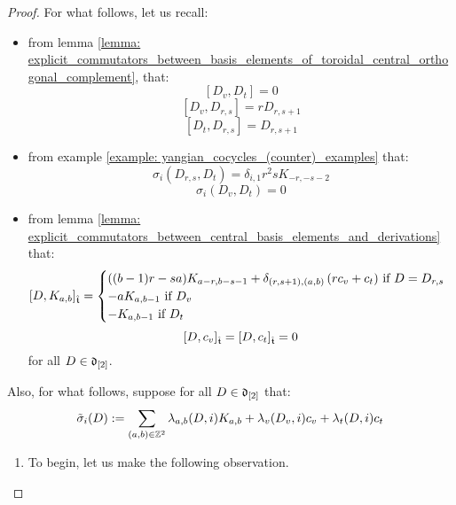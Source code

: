 \begin{proof}
                For what follows, let us recall:
                \begin{itemize}
                    \item from lemma \ref{lemma: explicit_commutators_between_basis_elements_of_toroidal_central_orthogonal_complement}, that:
                        $$[D_v, D_t] = 0$$
                        $$[D_v, D_{r, s}] = r D_{r, s + 1}$$
                        $$[D_t, D_{r, s}] = D_{r, s + 1}$$
                    \item from example \ref{example: yangian_cocycles_(counter)_examples} that:
                        $$\sigma_i(D_{r, s}, D_t) = \delta_{i, 1} r^2 s K_{-r, -s - 2}$$
                        $$\sigma_i(D_v, D_t) = 0$$
                    \item from lemma \ref{lemma: explicit_commutators_between_central_basis_elements_and_derivations} that:
                        $$
                            [D, K_{a, b}]_{\hat{\mathfrak{t}}} =
                            \begin{cases}
                                \text{$((b - 1)r - sa) K_{a - r, b - s - 1} + \delta_{(r, s + 1), (a, b)} \left( r c_v + c_t \right)$ if $D = D_{r, s}$}
                                \\
                                \text{$-a K_{a, b - 1}$ if $D_v$}
                                \\
                                \text{$-K_{a, b - 1}$ if $D_t$}
                            \end{cases}
                        $$
                        $$[D, c_v]_{\hat{\mathfrak{t}}} = [D, c_t]_{\hat{\mathfrak{t}}} = 0$$
                    for all $D \in \mathfrak{d}_{[2]}$.
                \end{itemize}

                Also, for what follows, suppose for all $D \in \mathfrak{d}_{[2]}$ that:
                    $$\tilde{\sigma}_i(D) := \sum_{(a, b) \in \mathbb{Z}^2} \lambda_{a, b}(D, i) K_{a, b} + \lambda_v(D_v, i) c_v + \lambda_t(D, i) c_t$$
                \begin{enumerate}
                    \item To begin, let us make the following observation.
                    

\end{enumerate}
\end{proof}
